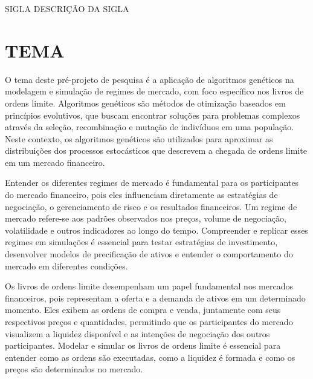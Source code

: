 \documentclass{pre-project}
\begin{document}
\frenchspacing 
\pretextual

\imprimircapa
\imprimirfolhaderosto

\listoffigures*
\cleardoublepage

\listoftables*
\cleardoublepage

\begin{siglas}
	\item [SIGLA] {DESCRIÇÃO DA SIGLA}
\end{siglas}

\tableofcontents*
\cleardoublepage

\textual


\chapter{TEMA}
O tema deste pré-projeto de pesquisa é a aplicação de algoritmos genéticos na modelagem e simulação de regimes de mercado, com foco específico nos livros de ordens limite. Algoritmos genéticos são métodos de otimização baseados em princípios evolutivos, que buscam encontrar soluções para problemas complexos através da seleção, recombinação e mutação de indivíduos em uma população. Neste contexto, os algoritmos genéticos são utilizados para aproximar as distribuições dos processos estocásticos que descrevem a chegada de ordens limite em um mercado financeiro.

Entender os diferentes regimes de mercado é fundamental para os participantes do mercado financeiro, pois eles influenciam diretamente as estratégias de negociação, o gerenciamento de risco e os resultados financeiros. Um regime de mercado refere-se aos padrões observados nos preços, volume de negociação, volatilidade e outros indicadores ao longo do tempo. Compreender e replicar esses regimes em simulações é essencial para testar estratégias de investimento, desenvolver modelos de precificação de ativos e entender o comportamento do mercado em diferentes condições.

Os livros de ordens limite desempenham um papel fundamental nos mercados financeiros, pois representam a oferta e a demanda de ativos em um determinado momento. Eles exibem as ordens de compra e venda, juntamente com seus respectivos preços e quantidades, permitindo que os participantes do mercado visualizem a liquidez disponível e as intenções de negociação dos outros participantes. Modelar e simular os livros de ordens limite é essencial para entender como as ordens são executadas, como a liquidez é formada e como os preços são determinados no mercado.
\end{document}
